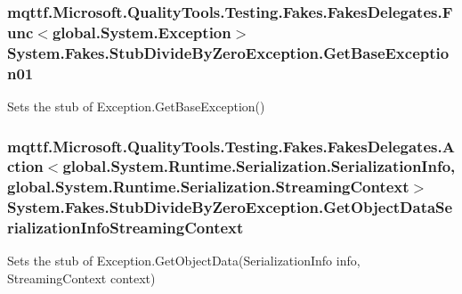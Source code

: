 \hypertarget{class_system_1_1_fakes_1_1_stub_divide_by_zero_exception_a0fd38b3747ad2eb251416389b5d5d0ca}{
\subsubsection[{Get\-Base\-Exception01}]{\setlength{\rightskip}{0pt plus 5cm}mqttf.\-Microsoft.\-Quality\-Tools.\-Testing.\-Fakes.\-Fakes\-Delegates.\-Func$<$global.\-System.\-Exception$>$ System.\-Fakes.\-Stub\-Divide\-By\-Zero\-Exception.\-Get\-Base\-Exception01}}\label{class_system_1_1_fakes_1_1_stub_divide_by_zero_exception_a0fd38b3747ad2eb251416389b5d5d0ca}


Sets the stub of Exception.\-Get\-Base\-Exception()

\hypertarget{class_system_1_1_fakes_1_1_stub_divide_by_zero_exception_af0b202f33f56dee5700c46ed164a2ff4}{
\subsubsection[{Get\-Object\-Data\-Serialization\-Info\-Streaming\-Context}]{\setlength{\rightskip}{0pt plus 5cm}mqttf.\-Microsoft.\-Quality\-Tools.\-Testing.\-Fakes.\-Fakes\-Delegates.\-Action$<$global.\-System.\-Runtime.\-Serialization.\-Serialization\-Info, global.\-System.\-Runtime.\-Serialization.\-Streaming\-Context$>$ System.\-Fakes.\-Stub\-Divide\-By\-Zero\-Exception.\-Get\-Object\-Data\-Serialization\-Info\-Streaming\-Context}}\label{class_system_1_1_fakes_1_1_stub_divide_by_zero_exception_af0b202f33f56dee5700c46ed164a2ff4}


Sets the stub of Exception.\-Get\-Object\-Data(\-Serialization\-Info info, Streaming\-Context context)

